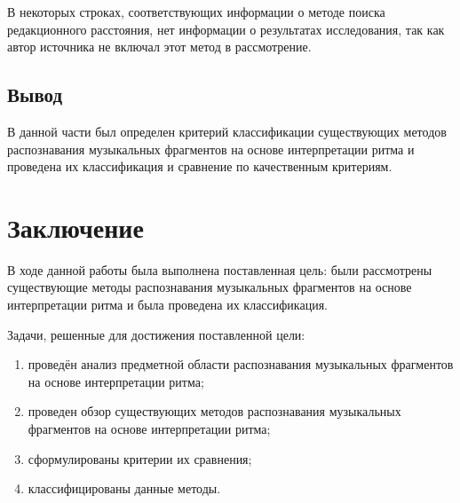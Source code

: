 В некоторых строках, соответствующих информации о методе поиска редакционного расстояния, нет информации о результатах исследования, так как автор источника \cite{bib12} не включал этот метод в рассмотрение.

\section{Вывод}

В данной части был определен критерий классификации существующих методов распознавания музыкальных фрагментов на основе интерпретации ритма и проведена их классификация и сравнение по качественным критериям.

\chapter*{Заключение}

В ходе данной работы была выполнена поставленная цель: были рассмотрены существующие методы распознавания музыкальных фрагментов на основе интерпретации ритма и была проведена их классификация.

Задачи, решенные  для достижения поставленной цели:
\begin{enumerate}
    \item проведён анализ предметной области распознавания музыкальных фрагментов на основе интерпретации ритма;
    \item проведен обзор существующих методов распознавания музыкальных фрагментов на основе интерпретации ритма;
    \item сформулированы критерии их сравнения;
    \item классифицированы данные методы.
\end{enumerate}

